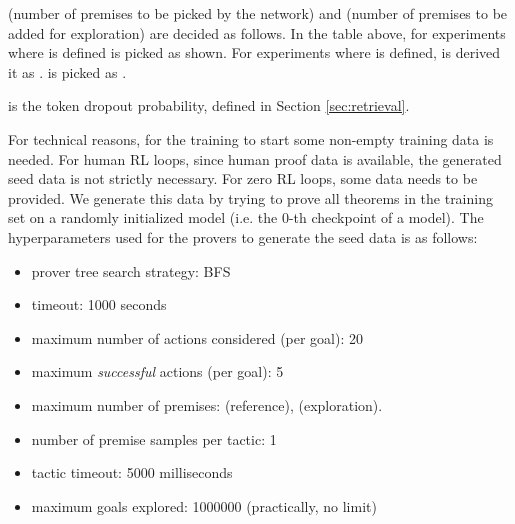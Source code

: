 \documentclass{article}
\begin{document}
 (number of premises to be picked by the network) and  (number of premises to be added for exploration) are decided as follows.
In the table above, for experiments where  is defined  is picked as shown.
For experiments where  is defined,  is derived it as .
 is picked as .

 is the token dropout probability, defined in Section \ref{sec:retrieval}.

For technical reasons, for the training to start some non-empty training data is needed.
For human RL loops, since human proof data is available, the generated seed data is not strictly necessary.
For zero RL loops, some data needs to be provided.
We generate this data by trying to prove all theorems in the training set on a randomly initialized model (i.e. the 0-th checkpoint of a model).
The hyperparameters used for the provers to generate the seed data is as follows:
\begin{itemize}
        \item prover tree search strategy: BFS
        \item timeout: 1000 seconds
        \item maximum number of actions considered (per goal): 20
        \item maximum \emph{successful} actions (per goal): 5
        \item maximum number of premises:  (reference),  (exploration).
        \item number of premise samples per tactic: 1
        \item tactic timeout: 5000 milliseconds
        \item maximum goals explored: 1000000 (practically, no limit)
\end{itemize}
\end{document}

